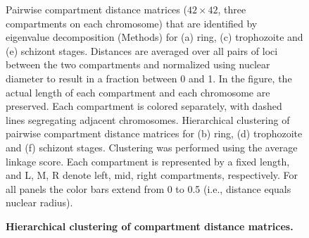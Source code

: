 \begin{figure}
  \begin{center}
   \hspace{0.04\textwidth}
   \hspace{0.1\textwidth}
   \hspace{0.04\textwidth}
   \hspace{0.1\textwidth}
   \hspace{0.04\textwidth}
  \end{center}
\caption{{\bf Hierarchical clustering of compartment distance matrices. }}
{Pairwise compartment distance matrices ($42\times42$, three compartments on each chromosome) that are identified
    by eigenvalue decomposition (Methods) for (a) ring, (c) trophozoite and (e) schizont stages. Distances are
    averaged over all pairs of loci between the two compartments and normalized using nuclear diameter to result
    in a fraction between 0 and 1. In the figure, the actual length of each compartment and each chromosome are preserved.
    Each compartment is colored separately, with dashed lines segregating adjacent chromosomes.
    Hierarchical clustering of pairwise compartment distance matrices for (b) ring, (d) trophozoite and
    (f) schizont stages. Clustering was performed using the average linkage score.
    Each compartment is represented by a fixed length, and L, M, R denote left, mid, right
    compartments, respectively. For all panels the color bars extend from 0 to 0.5
    (i.e., distance equals nuclear radius).
}
\label{suppfig:compDists}
\end{figure}
\clearpage

